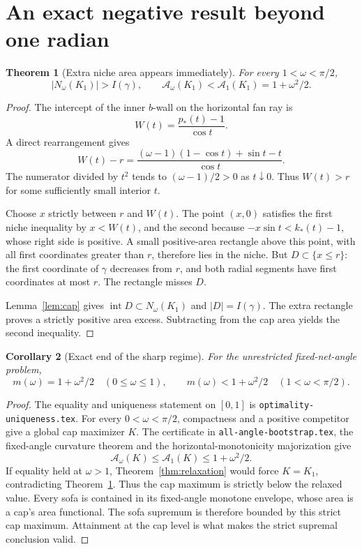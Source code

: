 \documentclass[11pt]{article}
\newtheorem{theorem}{Theorem}[section]
\newtheorem{corollary}[theorem]{Corollary}
\begin{document}
\section{An exact negative result beyond one radian}
\begin{theorem}[Extra niche area appears immediately]\label{thm:tails}
For every $1<\omega<\pi/2$,
\[
 |N_\omega(K_1)|>I(\gamma),\qquad
 \mathcal A_\omega(K_1)<\mathcal A_1(K_1)=1+\omega^2/2.
\]
\end{theorem}
\begin{proof}
The intercept of the inner $b$-wall on the horizontal fan ray is
\[
 W(t)=\frac{p_*(t)-1}{\cos t}.
\]
A direct rearrangement gives
\[
 W(t)-r=\frac{(\omega-1)(1-\cos t)+\sin t-t}{\cos t}.
\]
The numerator divided by $t^2$ tends to $(\omega-1)/2>0$ as $t\downarrow0$. Thus $W(t)>r$ for some sufficiently small interior $t$.

Choose $x$ strictly between $r$ and $W(t)$. The point $(x,0)$ satisfies the first niche inequality by $x<W(t)$, and the second because $-x\sin t<k_*(t)-1$, whose right side is positive. A small positive-area rectangle above this point, with all first coordinates greater than $r$, therefore lies in the niche. But $D\subset\{x\le r\}$: the first coordinate of $\gamma$ decreases from $r$, and both radial segments have first coordinates at most $r$. The rectangle misses $D$.

Lemma~\ref{lem:cap} gives $\operatorname{int}D\subset N_\omega(K_1)$ and $|D|=I(\gamma)$. The extra rectangle proves a strictly positive area excess. Subtracting from the cap area yields the second inequality.
\end{proof}

\begin{corollary}[Exact end of the sharp regime]\label{cor:strict}
For the unrestricted fixed-net-angle problem,
\[
 m(\omega)=1+\omega^2/2\quad(0\le\omega\le1),\qquad
 m(\omega)<1+\omega^2/2\quad(1<\omega<\pi/2).
\]
\end{corollary}
\begin{proof}
The equality and uniqueness statement on $[0,1]$ is \texttt{optimality-uniqueness.tex}. For every $0<\omega<\pi/2$, compactness and a positive competitor give a global cap maximizer $K$. The certificate in \texttt{all-angle-bootstrap.tex}, the fixed-angle curvature theorem and the horizontal-monotonicity majorization give
\[
 \mathcal A_\omega(K)\le\mathcal A_1(K)\le1+\omega^2/2.
\]
If equality held at $\omega>1$, Theorem~\ref{thm:relaxation} would force $K=K_1$, contradicting Theorem~\ref{thm:tails}. Thus the cap maximum is strictly below the relaxed value. Every sofa is contained in its fixed-angle monotone envelope, whose area is a cap's area functional. The sofa supremum is therefore bounded by this strict cap maximum. Attainment at the cap level is what makes the strict supremal conclusion valid.
\end{proof}
\end{document}
